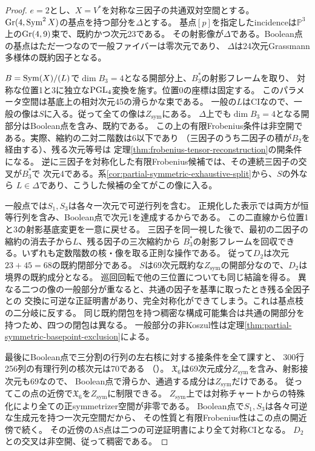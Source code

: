 \begin{proof}
$e=2$とし、$X=V^*$を対称な三因子の共通双対空間とする。
$\operatorname{Gr}(4,\operatorname{Sym}^2X)$の基点を持つ部分を$\Delta$とする。
基点$[p]$を指定したincidenceは$\mathbb P^3$上の$\operatorname{Gr}(4,9)$束で、既約かつ次元23である。
その射影像が$\Delta$である。Boolean点の基点はただ一つなので一般ファイバーは零次元であり、
$\Delta$は24次元Grassmann多様体の既約因子となる。

$B=\operatorname{Sym}(X)/(L)$で$\dim B_3=4$となる開部分上、$B_3^*$の射影フレームを取り、
対称な位置1と3に独立な$\operatorname{PGL}_4$変換を施す。位置0の座標は固定する。
このパラメータ空間は基底上の相対次元45の滑らかな束である。
一般の$L$はCIなので、一般の像は$S$に入る。従って全ての像は$Z_{\mathrm{sym}}$にある。
$\Delta$上でも$\dim B_3=4$となる開部分はBoolean点を含み、既約である。
この上の有限Frobenius条件は非空開である。実際、縮約の二対二階数は$6$以下であり
（三因子のうち二因子の積が$B_2$を経由する）、残る次元等号は
定理\ref{thm:frobenius-tensor-reconstruction}の開条件になる。
逆に三因子を対称化した有限Frobenius候補では、その連続三因子の交叉が$B_3^*$で
次元4である。系\ref{cor:partial-symmetric-exhaustive-split}から、$S$の外なら
$L\in\Delta$であり、こうした候補の全てがこの像に入る。

一般点では$S_1,S_3$は各々一次元で可逆行列を含む。
正規化した表示では両方が恒等行列を含み、Boolean点で次元1を達成するからである。
この二直線から位置1と3の射影基底変更を一意に戻せる。
三因子を同一視した後で、最初の二因子の縮約の消去子から$L$、残る因子の三次縮約から
$B_3^*$の射影フレームを回収できる。いずれも定数階数の核・像を取る正則な操作である。
従って$D_2$は次元$23+45=68$の既約閉部分である。
$S$は69次元既約な$Z_{\mathrm{sym}}$の開部分なので、$D_2$は境界の既約成分となる。
巡回回転で他の三位置についても同じ結論を得る。
異なる二つの像の一般部分が重なると、共通の因子を基準に取ったとき残る全因子との
交換に可逆な正証明書があり、完全対称化ができてしまう。これは基点枝の二分岐に反する。
同じ既約閉包を持つ稠密な構成可能集合は共通の開部分を持つため、四つの閉包は異なる。
一般部分の非Koszul性は定理\ref{thm:partial-symmetric-basepoint-exclusion}による。

最後にBoolean点で三分割の行列の左右核に対する接条件を全て課すと、
300行256列の有理行列の核次元は70である
（）。
$\mathfrak X_6$は69次元成分$Z_{\mathrm{sym}}$を含み、射影接次元も69なので、
Boolean点で滑らか、通過する成分は$Z_{\mathrm{sym}}$だけである。
従ってこの点の近傍で$\mathfrak X_6$を$Z_{\mathrm{sym}}$に制限できる。
$Z_{\mathrm{sym}}$上では対称チャートからの特殊化により全ての正symmetrizer空間が非零である。
Boolean点で$S_1,S_3$は各々可逆な生成元を持つ一次元空間だから、
その性質と有限Frobenius性はこの点の開近傍で続く。
その近傍のAS点は二つの可逆証明書により全て対称CIとなる。
$D_2$との交叉は非空開、従って稠密である。
\end{proof}


